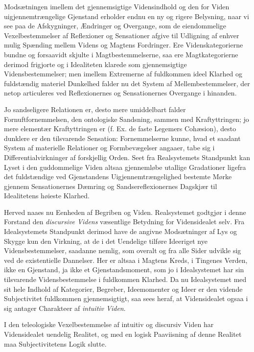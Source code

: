 \documentclass[11pt]{book}
\newcommand{\opage}[1]{\marginnote{\footnotesize\textit{[#1]}}}
\begin{document}
Modsætningen imellem det gjennemsigtige Vidensindhold og den for
Viden uigjennemtrængelige Gjenstand erholder endnu en ny og rigere
Belysning, naar vi see paa de Afskygninger, Ændringer og Overgange,
som de eiendommelige Vexelbestemmelser af Reflexioner og Sensationer
afgive til Udligning af enhver mulig Spænding mellem Videns og
Magtens Fordringer. Ere Videnskategorierne bundne og forsaavidt
skjulte i Magtbestemmelserne, saa ere Magtkategorierne derimod
frigjorte og i Idealiteten klarede som gjennemsigtige
Vidensbestemmelser; men imellem Extremerne af fuldkommen ideel
Klarhed og fuldstændig materiel Dunkelhed falder nu det System af
Mellembestemmelser, der netop articuleres ved Reflexionernes og
Sensationernes Overgange i hinanden.

Jo sandseligere Relationen er, desto mere umiddelbart falder
Fornuftfornemmelsen, den ontologiske Sandsning, sammen med
Kraftyttringen; jo mere elementær Kraftyttringen er (f. Ex. de faste
Legemers Cohæsion), desto dunklere er
\opage{263} \setcounter{footnote}{0}%
den tilsvarende Sensation: Fornemmelserne kunne, hvad et saadant
System af materielle Relationer og Formbevægelser angaaer, tabe sig i
Differentialvirkninger af forskjellig Orden. Seet fra Realsystemets
Standpunkt kan Lyset i den guddommelige Viden altsaa gjennemløbe
utallige Gradationer ligefra det fuldstændige ved Gjenstandens
Uigjennemtrængelighed bestemte Mørke gjennem Sensationernes Dæmring
og Sandsereflexionernes Dagskjær til Idealitetens høieste Klarhed.

Herved naaes nu Eenheden af Begriben og Viden. Realsystemet godtgjør
i denne Forstand den \emph{discursive Videns} væsentlige Betydning
for Vidensidealet selv. Fra Idealsystemets Standpunkt derimod have
de angivne Modsætninger af Lys og Skygge kun den Virkning, at de i
det Uendelige tilføre Ideeriget nye Vidensbestemmelser, saadanne
nemlig, som overalt og fra alle Sider udvikle sig ved de existentielle
Dannelser. Her er altsaa i Magtens Kreds, i Tingenes Verden, ikke en
Gjenstand, ja ikke et Gjenstandsmoment, som jo i Idealsystemet har
sin tilsvarende Vidensbestemmelse i fuldkommen Klarhed. Da nu
Idealsystemet med sit hele Indhold af Kategorier, Begreber,
Ideemomenter og Ideer er den vidende Subjectivitet fuldkommen
gjennemsigtigt, saa sees heraf, at Vidensidealet ogsaa i sig antager
Charakteer af \emph{intuitiv Viden}.

I den teleologiske Vexelbestemmelse af intuitiv og discursiv Viden
har Vidensidealet uendelig Realitet, og med en logisk Paaviisning af
denne Realitet maa Subjectivitetens Logik slutte.
\end{document}
